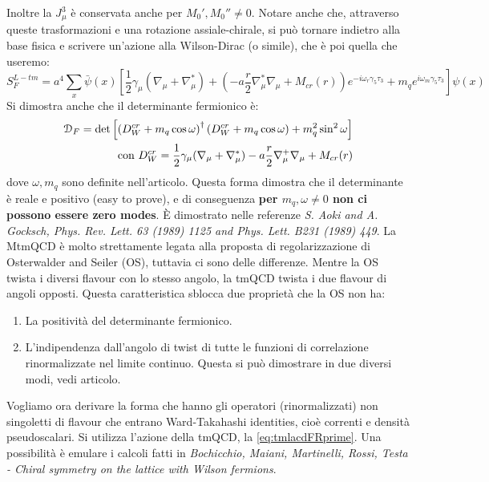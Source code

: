 \documentclass[12pt,a4paper,openright]{article}
\newcommand{\colg}{\textcolor{PineGreen}}
\begin{document}
Inoltre la $J_\mu^3$ è conservata anche per $M_0', M_0'' \ne 0$.
Notare anche che, attraverso queste trasformazioni e una rotazione assiale-chirale, si può tornare indietro alla base fisica e scrivere un'azione alla Wilson-Dirac (o simile), che è poi quella che useremo:
\begin{equation}\label{eq:tmlacdFRprime}
  S_F^{L-tm} = a^4 \sum_{x} \bar \psi (x) \left[ \frac{1}{2} \gamma_\mu \left(\nabla_\mu + \nabla_\mu^*\right) + \left( - a \frac{r}{2} \nabla_\mu^* \nabla_\mu + M_{cr}(r) \right)e^{-i\omega_r \gamma_5 \tau_3} +m_q e^{i \omega_m \gamma_5 \tau_3}\right] \psi (x)
\end{equation}
Si dimostra anche che il determinante fermionico è:
\begin{equation*}
  \begin{aligned}
    \mathcal D_F = \text{det} \left[\left(D_W^{cr} + m_q \cos \omega\right)^\dagger\left(D_W^{cr} + m_q \cos \omega\right) + m_q^2 \sin^2 \omega\right]\\
    \text{ con } \space D_W^{cr} = \frac{1}{2}\gamma_\mu(\nabla_\mu + \nabla_\mu^*)  - a \frac{r}{2} \nabla_\mu^+ \nabla_\mu + M_{cr}(r)
  \end{aligned}
\end{equation*}
dove $\omega, m_q$ sono definite nell'articolo. Questa forma dimostra che il determinante è reale e positivo (easy to prove), e di conseguenza \colg{\bf per $m_q, \omega \ne 0$ non ci possono essere zero modes}.
È dimostrato nelle referenze \textit{S. Aoki and A. Gocksch, Phys. Rev. Lett. 63 (1989) 1125 and Phys. Lett. B231 (1989) 449}.
\newline
La MtmQCD è molto strettamente legata alla proposta di regolarizzazione di Osterwalder and Seiler (OS), tuttavia ci sono delle differenze.
\colg{Mentre la OS twista i diversi flavour con lo stesso angolo, la tmQCD twista i due flavour di angoli opposti}.
Questa caratteristica sblocca due proprietà che la OS non ha:
\begin{enumerate}
  \item La positività del determinante fermionico.
  \item L'indipendenza dall'angolo di twist di tutte le funzioni di correlazione rinormalizzate nel limite continuo.
  Questa si può dimostrare in due diversi modi, vedi articolo.
\end{enumerate}
Vogliamo ora derivare la forma che hanno gli operatori (rinormalizzati) non singoletti di flavour che entrano Ward-Takahashi identities, cioè correnti e densità pseudoscalari.
Si utilizza l'azione della tmQCD, la \ref{eq:tmlacdFRprime}. Una possibilità è emulare i calcoli fatti in \textit{Bochicchio, Maiani, Martinelli, Rossi, Testa - Chiral symmetry on the lattice with Wilson fermions}.
\end{document}
